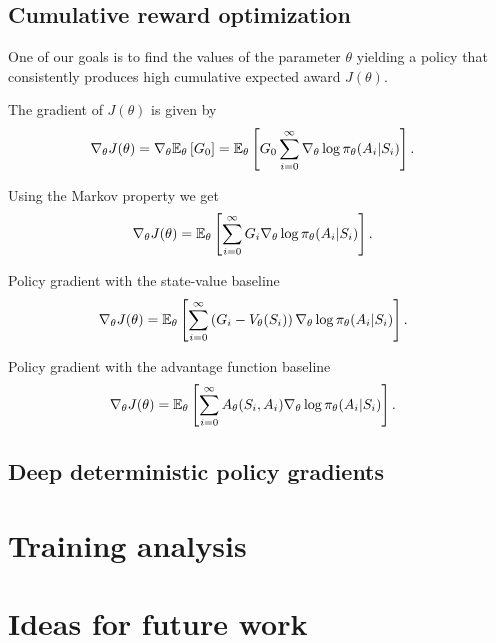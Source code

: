 \documentclass[a4paper,12pt]{amsart}
\newcommand{\stateValueFunc}{V}
\newcommand{\advantageFunc}{A}
\newcommand{\policy}{\pi}
\begin{document}
\subsection{Cumulative reward optimization}
One of our goals is to find the values of the parameter $\theta$ yielding a
policy that consistently produces high cumulative expected award $J(\theta)$.

The gradient of $J(\theta)$ is given by
\begin{align*}
    \nabla_{\theta} J(\theta) &= 
    \nabla_{\theta} \E_{\theta} \left[ G_{0} \right] = 
    \E_{\theta} \left[ G_0 \sum_{i=0}^{\infty} 
    \nabla_{\theta}\log\policy_{\theta}(A_i | S_i) \right].
\end{align*}

Using the Markov property we get
\begin{align*}
    \nabla_{\theta} J(\theta) &= 
    \E_{\theta} \left[ \sum_{i=0}^{\infty} G_{i}
    \nabla_{\theta}\log\policy_{\theta}(A_i | S_i)  \right].
\end{align*}

Policy gradient with the state-value baseline
\begin{align*}
    \nabla_{\theta} J(\theta) &= 
    \E_{\theta} \left[ \sum_{i=0}^{\infty} \left( G_{i}-\stateValueFunc_{\theta}(S_i) \right)
    \nabla_{\theta}\log\policy_{\theta}(A_i | S_i) \right].
\end{align*}

Policy gradient with the advantage function baseline
\begin{align*}
    \nabla_{\theta} J(\theta) &= 
    \E_{\theta} \left[ \sum_{i=0}^{\infty} \advantageFunc_{\theta}(S_i, A_i)
    \nabla_{\theta}\log\policy_{\theta}(A_i | S_i) \right].
\end{align*}

\subsection{Deep deterministic policy gradients}












\section{Training analysis}

\section{Ideas for future work}

\nocite{Cinlar2011}
\printbibliography
\end{document}
